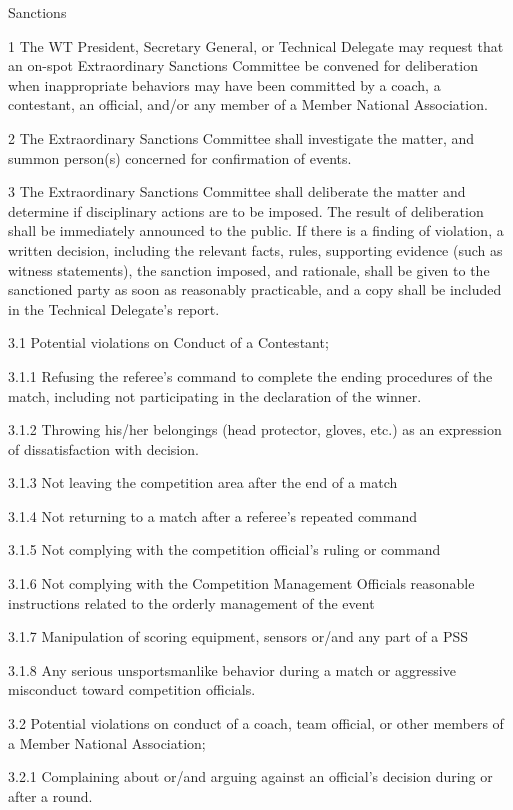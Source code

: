 \documentclass[
]{report}
\begin{document}
Sanctions

1 The WT President, Secretary General, or Technical Delegate may request
that an on-spot Extraordinary Sanctions Committee be convened for
deliberation when inappropriate behaviors may have been committed by a
coach, a contestant, an official, and/or any member of a Member National
Association.

2 The Extraordinary Sanctions Committee shall investigate the matter,
and summon person(s) concerned for confirmation of events.

3 The Extraordinary Sanctions Committee shall deliberate the matter and
determine if disciplinary actions are to be imposed. The result of
deliberation shall be immediately announced to the public. If there is a
finding of violation, a written decision, including the relevant facts,
rules, supporting evidence (such as witness statements), the sanction
imposed, and rationale, shall be given to the sanctioned party as soon
as reasonably practicable, and a copy shall be included in the Technical
Delegate's report.

3.1 Potential violations on Conduct of a Contestant;

3.1.1 Refusing the referee's command to complete the ending procedures
of the match, including not participating in the declaration of the
winner.

3.1.2 Throwing his/her belongings (head protector, gloves, etc.) as an
expression of dissatisfaction with decision.

3.1.3 Not leaving the competition area after the end of a match

3.1.4 Not returning to a match after a referee's repeated command

3.1.5 Not complying with the competition official's ruling or command

3.1.6 Not complying with the Competition Management Officials reasonable
instructions related to the orderly management of the event

3.1.7 Manipulation of scoring equipment, sensors or/and any part of a
PSS

3.1.8 Any serious unsportsmanlike behavior during a match or aggressive
misconduct toward competition officials.

3.2 Potential violations on conduct of a coach, team official, or other
members of a Member National Association;

3.2.1 Complaining about or/and arguing against an official's decision
during or after a round.
\end{document}
